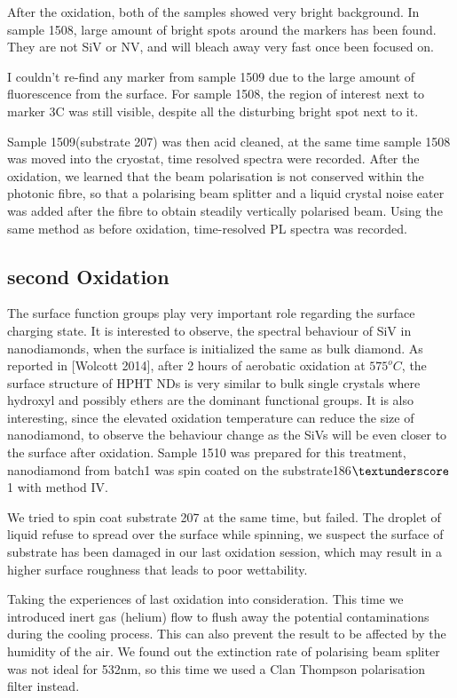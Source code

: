 After the oxidation, both of the samples showed very bright background. In sample 1508, large amount of bright spots around the markers has been found. They are not SiV or NV, and will bleach away very fast once been focused on.

I couldn't re-find any marker from sample 1509 due to the large amount of fluorescence from the surface. For sample 1508, the region of interest next to marker 3C was still visible, despite all the disturbing bright spot next to it.

Sample 1509(substrate 207) was then acid cleaned, at the same time sample 1508 was moved into the cryostat, time resolved spectra were recorded. After the oxidation, we learned that the beam polarisation is not conserved within the photonic fibre, so that a polarising beam splitter and a liquid crystal noise eater was added after the fibre to obtain steadily vertically polarised beam. Using the same method as before oxidation, time-resolved PL spectra was recorded.

\subsection[Second Oxidation]{second Oxidation}

The surface function groups play very important role regarding the surface charging state. It is interested to observe, the spectral behaviour of SiV in nanodiamonds, when the surface is initialized the same as bulk diamond. As reported in [Wolcott 2014], after 2 hours of aerobatic oxidation at $575^{o}C$, the surface structure of HPHT NDs is very similar to bulk single crystals where hydroxyl and possibly ethers are the dominant functional groups. It is also interesting, since the elevated oxidation temperature can reduce the size of nanodiamond, to observe the behaviour change as the SiVs will be even closer to the surface after oxidation. Sample 1510 was prepared for this treatment, nanodiamond from batch1 was spin coated on the substrate186$\textunderscore$1 with method IV.

We tried to spin coat substrate 207 at the same time, but failed. The droplet of liquid refuse to spread over the surface while spinning, we suspect the surface of substrate has been damaged in our last oxidation session, which may result in a higher surface roughness that leads to poor wettability.

Taking the experiences of last oxidation into consideration. This time we introduced inert gas (helium) flow to flush away the potential contaminations during the cooling process. This can also prevent the result to be affected by the humidity of the air.
We found out the extinction rate of polarising beam spliter was not ideal for 532nm, so this time we used a Clan Thompson polarisation filter instead.

